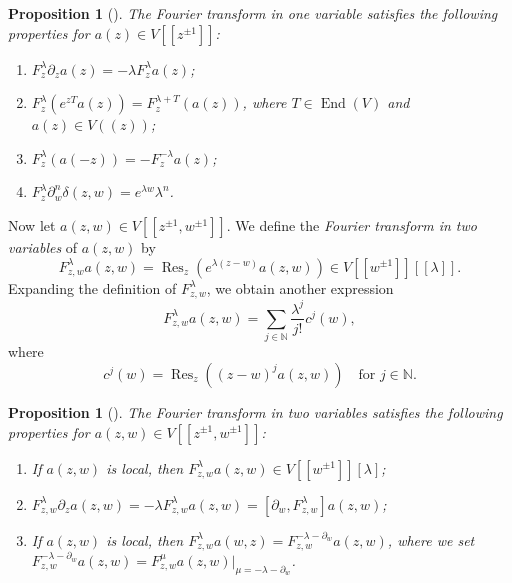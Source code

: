 \documentclass[a4paper, 12pt, reqno]{amsart}
\newtheorem{proposition}[theorem]{Proposition}
\theoremstyle{remark}
\numberwithin{equation}{subsection}
\DeclareMathOperator{\End}{End}
\DeclareMathOperator{\Res}{Res}
\begin{document}
\begin{proposition}[{\cite[Proposition 1.5.2]{nozaradan_introduction_2008}}]
  \label{prp:2}
  The Fourier transform in one variable satisfies the following properties for $a(z) \in V[[z^{\pm 1}]]$:
  \begin{enumerate}
  \item $F^{\lambda}_z\partial_za(z) = -\lambda F^{\lambda}_za(z)$;
  \item $F^{\lambda}_z(e^{zT}a(z)) = F^{\lambda + T}_z(a(z))$, where $T \in \End(V)$ and $a(z) \in V((z))$;
  \item $F^{\lambda}_z(a(-z)) = -F^{-\lambda}_za(z)$;
  \item $F^{\lambda}_z\partial^n_w\delta(z, w) = e^{\lambda w}\lambda^n$.
  \end{enumerate}
\end{proposition}

Now let $a(z, w) \in V[[z^{\pm 1}, w^{\pm 1}]]$.
We define the \emph{Fourier transform in two variables} of $a(z, w)$ by
\begin{equation*}
  F^{\lambda}_{z, w}a(z, w) = \Res_z(e^{\lambda(z - w)}a(z, w)) \in V[[w^{\pm 1}]][[\lambda]].
\end{equation*}
Expanding the definition of $F^{\lambda}_{z, w}$, we obtain another expression
\begin{equation*}
  F^{\lambda}_{z, w}a(z, w) = \sum_{j \in \mathbb{N}}\frac{\lambda^j}{j!}c^j(w),
\end{equation*}
where
\begin{equation*}
  c^j(w) = \Res_z((z - w)^ja(z, w)) \quad \text{for }j \in \mathbb{N}.
\end{equation*}

\begin{proposition}[{\cite[Proposition 1.5.4]{nozaradan_introduction_2008}}]
  \label{prp:3}
  The Fourier transform in two variables satisfies the following properties for $a(z, w) \in V[[z^{\pm 1}, w^{\pm 1}]]$:
  \begin{enumerate}
  \item If $a(z, w)$ is local, then $F^{\lambda}_{z, w}a(z, w) \in V[[w^{\pm 1}]][\lambda]$;
  \item $F^{\lambda}_{z, w}\partial_za(z, w) = -\lambda F^{\lambda}_{z, w}a(z, w) = [\partial_w, F^{\lambda}_{z, w}]a(z, w)$;
  \item If $a(z, w)$ is local, then $F^{\lambda}_{z, w}a(w, z) = F^{-\lambda - \partial_w}_{z, w}a(z, w)$, where we set $F^{-\lambda - \partial_w}_{z, w}a(z, w) = F^{\mu}_{z, w}a(z, w)|_{\mu = -\lambda - \partial_w}$.
  \end{enumerate}
\end{proposition}
\end{document}

